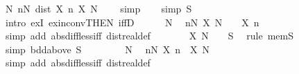 \begin{isabellebody}
\ N{\isacharcolon}{\kern0pt}\ {\isachardoublequoteopen}{\isasymforall}n{\isasymge}N{\isachardot}{\kern0pt}\ dist\ {\isacharparenleft}{\kern0pt}X\ n{\isacharparenright}{\kern0pt}\ {\isacharparenleft}{\kern0pt}X\ N{\isacharparenright}{\kern0pt}\ {\isacharless}{\kern0pt}\ {}{\isachardoublequoteclose}\ \isamarkupfalse%
\ simp\isanewline
\ \ \isamarkupfalse%
\ {\isacharbrackleft}{\kern0pt}simp{\isacharbrackright}{\kern0pt}{\isacharcolon}{\kern0pt}\ {\isachardoublequoteopen}S\ {\isasymnoteq}\ {\isacharbraceleft}{\kern0pt}{\isacharbraceright}{\kern0pt}{\isachardoublequoteclose}\isanewline
\ \ \isamarkupfalse%
\ {\isacharparenleft}{\kern0pt}intro\ exI\ ex{\isacharunderscore}{\kern0pt}in{\isacharunderscore}{\kern0pt}conv{\isacharbrackleft}{\kern0pt}THEN\ iffD{}{\isacharbrackright}{\kern0pt}{\isacharparenright}{\kern0pt}\isanewline
\ \ \ \ \isamarkupfalse%
\ N\ \isamarkupfalse%
\ {\isachardoublequoteopen}{\isasymforall}n{\isasymge}N{\isachardot}{\kern0pt}\ X\ N\ {\isacharminus}{\kern0pt}\ {}\ {\isacharless}{\kern0pt}\ X\ n{\isachardoublequoteclose}\isanewline
\ \ \ \ \ \ \isamarkupfalse%
\ {\isacharparenleft}{\kern0pt}simp\ add{\isacharcolon}{\kern0pt}\ abs{\isacharunderscore}{\kern0pt}diff{\isacharunderscore}{\kern0pt}less{\isacharunderscore}{\kern0pt}iff\ dist{\isacharunderscore}{\kern0pt}real{\isacharunderscore}{\kern0pt}def{\isacharparenright}{\kern0pt}\isanewline
\ \ \ \ \isamarkupfalse%
\ \isamarkupfalse%
\ {\isachardoublequoteopen}X\ N\ {\isacharminus}{\kern0pt}\ {}\ {\isasymin}\ S{\isachardoublequoteclose}\ \isamarkupfalse%
\ {\isacharparenleft}{\kern0pt}rule\ mem{\isacharunderscore}{\kern0pt}S{\isacharparenright}{\kern0pt}\isanewline
\ \ \isamarkupfalse%
\isanewline
\ \ \isamarkupfalse%
\ {\isacharbrackleft}{\kern0pt}simp{\isacharbrackright}{\kern0pt}{\isacharcolon}{\kern0pt}\ {\isachardoublequoteopen}bdd{\isacharunderscore}{\kern0pt}above\ S{\isachardoublequoteclose}\isanewline
\ \ \isamarkupfalse%
\isanewline
\ \ \ \ \isamarkupfalse%
\ N\ \isamarkupfalse%
\ {\isachardoublequoteopen}{\isasymforall}n{\isasymge}N{\isachardot}{\kern0pt}\ X\ n\ {\isacharless}{\kern0pt}\ X\ N\ {\isacharplus}{\kern0pt}\ {}{\isachardoublequoteclose}\isanewline
\ \ \ \ \ \ \isamarkupfalse%
\ {\isacharparenleft}{\kern0pt}simp\ add{\isacharcolon}{\kern0pt}\ abs{\isacharunderscore}{\kern0pt}diff{\isacharunderscore}{\kern0pt}less{\isacharunderscore}{\kern0pt}iff\ dist{\isacharunderscore}{\kern0pt}real{\isacharunderscore}{\kern0pt}def{\isacharparenright}{\kern0pt}\isanewline

\end{isabellebody}
